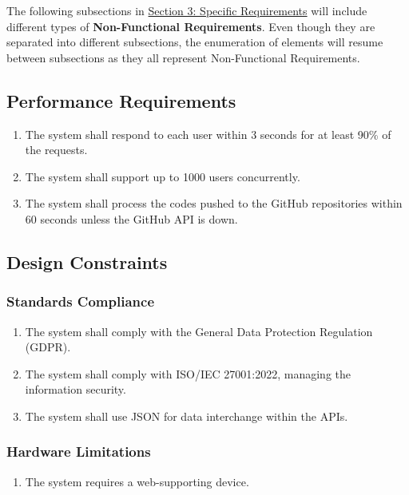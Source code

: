 \vspace{3mm}

\noindent The following subsections in \hyperref[sect:requirements]{Section 3: Specific Requirements} will include different types of \textbf{Non-Functional Requirements}. Even though they are separated into different subsections, the enumeration of elements will resume between subsections as they all represent Non-Functional Requirements.



\subsection{Performance Requirements}
\begin{enumerate}
    \item The system shall respond to each user within 3 seconds for at least 90\% of the requests.
    \item The system shall support up to 1000 users concurrently.
    \item The system shall process the codes pushed to the GitHub repositories within 60 seconds unless the GitHub API is down.
\end{enumerate}
    

\subsection{Design Constraints}
\subsubsection{Standards Compliance}
\begin{enumerate}[resume]
    \item The system shall comply with the General Data Protection Regulation (GDPR).
    \item The system shall comply with ISO/IEC 27001:2022, managing the information security.
    \item The system shall use JSON for data interchange within the APIs.
\end{enumerate}
 

\subsubsection{Hardware Limitations}
\begin{enumerate}[resume]
    \item The system requires a web-supporting device.
\end{enumerate}
 

